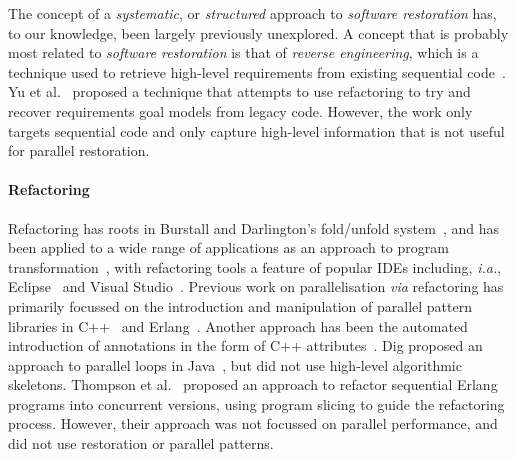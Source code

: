 The concept of a \emph{systematic}, or \emph{structured} approach to \emph{software restoration} has, to our knowledge, been largely previously unexplored. A concept that is probably most related to \emph{software restoration} is that of \emph{reverse engineering}, which is a technique used to retrieve high-level requirements from existing sequential code~\cite{10.1145/287000.287001}\cite{10.1145/337180.337234}. Yu et al.~\cite{10.1109/RE.2005.61} proposed a technique that attempts to use refactoring to try and recover requirements goal models from legacy code. However, the work only targets sequential code and only capture high-level information that is not useful for parallel restoration.

\paragraph{Refactoring}
Refactoring has roots in Burstall and Darlington's fold/unfold system~\cite{darlington77}, and has been applied to a wide range of applications as an approach to program transformation~\cite{mens_refactoring}, with refactoring tools a feature of popular IDEs including, \textit{i.a.}, Eclipse~\cite{EclipseWeb} and Visual Studio~\cite{VisualStudioWeb}.
Previous work on parallelisation \textit{via} refactoring has primarily focussed on the introduction and manipulation of parallel pattern libraries in C++~\cite{brownagricultural,DBLP:conf/pdp/JanjicBMHDAG16} and Erlang~\cite{hlpp,DBLP:journals/cai/BarwellBHTB16}. Another approach
has been the automated introduction of annotations in the form of
C++ attributes~\cite{rio:2018}. Dig proposed an approach to parallel loops in Java~\cite{dig}, but did not use high-level algorithmic skeletons. Thompson et al.~\cite{10.1145/2678015.2682533} proposed an approach to refactor sequential Erlang programs into concurrent versions, using program slicing to guide the refactoring process. However, their approach was not focussed on parallel performance, and did not use restoration or parallel patterns.  

